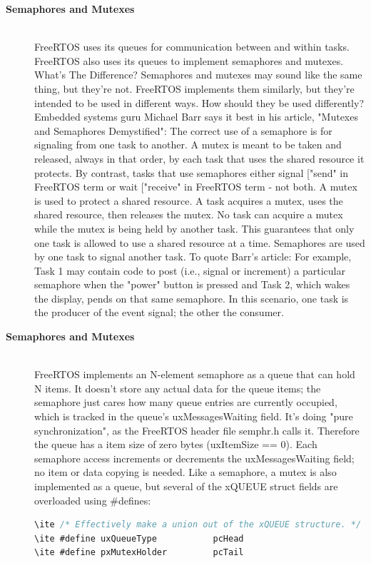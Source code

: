 \begin{description}
\item[{\rot\bf Semaphores and Mutexes}]~\\[-3ex]
\bi
\ite FreeRTOS uses its queues for communication between and within tasks.
\ite FreeRTOS also uses its queues to implement semaphores and mutexes.
\ite
\ite What's The Difference?
\ite Semaphores and mutexes may sound like the same thing, but they're not. FreeRTOS implements them similarly, but they're intended to be used in different ways. How should they be used differently?
\ite Embedded systems guru Michael Barr says it best in his article, "Mutexes and Semaphores Demystified":
\ite
\ite The correct use of a semaphore is for signaling from one task to another. A mutex is meant to be taken and released, always in that order, by each task that uses the shared resource it protects. By contrast, tasks that use semaphores either signal ["send" in FreeRTOS term or wait ["receive" in FreeRTOS term - not both.
\ite A mutex is used to protect a shared resource. A task acquires a mutex, uses the shared resource, then releases the mutex. No task can acquire a mutex while the mutex is being held by another task. This guarantees that only one task is allowed to use a shared resource at a time.
\ite
\ite Semaphores are used by one task to signal another task. To quote Barr's article:
\ite
\ite For example, Task 1 may contain code to post (i.e., signal or increment) a particular semaphore when the "power" button is pressed and Task 2, which wakes the display, pends on that same semaphore. In this scenario, one task is the producer of the event signal; the other the consumer.
\ei

\os{\newpage}



\item[{\rot\bf Semaphores and Mutexes}]~\\[-3ex]
\bi
\ite FreeRTOS implements an N-element semaphore as a queue that can hold N items. It doesn't store any actual data for the queue items; the semaphore just cares how many queue entries are currently occupied, which is tracked in the queue's uxMessagesWaiting field. It's doing "pure synchronization", as the FreeRTOS header file semphr.h calls it. Therefore the queue has a item size of zero bytes (uxItemSize == 0). Each semaphore access increments or decrements the uxMessagesWaiting field; no item or data copying is needed.
\ite
\ite Like a semaphore, a mutex is also implemented as a queue, but several of the xQUEUE struct fields are overloaded using \#defines:
\begin{lstlisting}[language=C]
\ite /* Effectively make a union out of the xQUEUE structure. */
\ite #define uxQueueType           pcHead
\ite #define pxMutexHolder         pcTail
\end{lstlisting}


\end{description}
